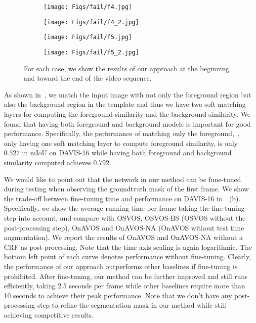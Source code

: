 \begin{figure}[t]
{}
	\label{fig:qual}
\setlength{\figwidth}{0.25\textwidth}
\begin{center}
		\begin{subfigure}[b]{0.98\figwidth}\texttt{[image: Figs/fail/f4.jpg]} \\
		\end{subfigure}
		\begin{subfigure}[b]{0.98\figwidth}\texttt{[image: Figs/fail/f4\_2.jpg]} \\
		\end{subfigure}\hfill
		\begin{subfigure}[b]{0.98\figwidth}\texttt{[image: Figs/fail/f5.jpg]} \\
		\end{subfigure}
		\begin{subfigure}[b]{0.98\figwidth}\texttt{[image: Figs/fail/f5\_2.jpg]} \\
		\end{subfigure}
	\end{center}
\caption{ For each case, we show the results of our approach at the beginning and toward the end of the video sequence.}
	\label{fig:failure}
\end{figure} 

As shown in~, we match the input image with not only the foreground region but also the background region in the template and thus we have two soft matching layers for computing the foreground similarity and the background similarity. We found that having both foreground and background models is important for good performance. Specifically, the performance of matching only the foreground,~\ie, only having one soft matching layer to compute foreground similarity, is only $0.527$ in mIoU on DAVIS-16 while having both foreground and background similarity computed achieves $0.792$. 

 We would like to point out that the network in our method can be fune-tuned during testing when observing the groundtruth mask of the first frame. We show the trade-off between fine-tuning time and performance on DAVIS-16 in~~(b). Specifically, we show the average running time per frame taking the fine-tuning step into account, and  compare with OSVOS, OSVOS-BS (OSVOS without the post-processing step), OnAVOS and OnAVOS-NA (OnAVOS without test time augmentation). We report the results of OnAVOS and OnAVOS-NA without a CRF as post-processing. Note that the time axis scaling is again logarithmic. The bottom left  point of each curve denotes performance without fine-tuning. Clearly, the performance of our approach outperforms other baselines if fine-tuning is prohibited. After fine-tuning, our method can be further improved and still runs efficiently, taking 2.5 seconds per frame while other baselines require more than 10 seconds to achieve their peak performance. Note that we don't have any post-processing step to refine the segmentation mask in our method while still achieving competitive results. 




